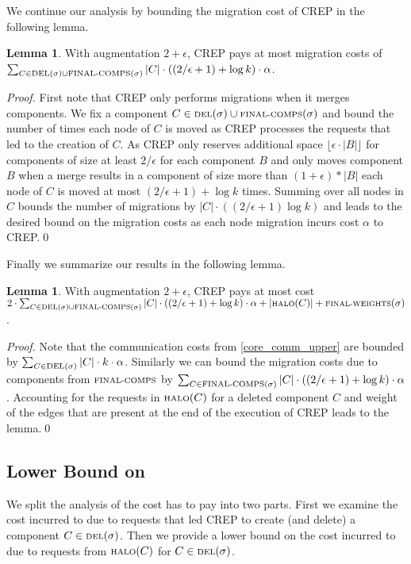 \documentclass[a4paper,xcolor=dvipsnames, tikz, 12pt]{article}
\newcommand{\nl}{\newline}
\newcommand{\crep}{C{\scriptsize REP}}
\newcommand{\del}{\text{\scriptsize DEL}}
\newcommand{\opt}{\text{O{\scriptsize PT}}}
\newcommand{\halo}{\text{\scriptsize HALO}}
\newcommand{\finalComps}{\text{\scriptsize FINAL-COMPS}}
\newcommand{\finalWeights}{\text{\scriptsize FINAL-WEIGHTS}}
\theoremstyle{definition}
\newtheorem{lemma}[defi]{Lemma}
\begin{document}
We continue our analysis by bounding the migration cost of \crep{} in the following lemma.
\begin{lemma}
	With augmentation $2+\epsilon$, \crep{} pays at most migration costs of\nl $\sum_{C\in\del{}(\sigma)\cup\finalComps(\sigma)}|C|\cdot((2/\epsilon+1)+\log k)\cdot\alpha$.
\end{lemma}

\textit{Proof.} First note that \crep{} only performs migrations when it merges components.
We fix a component $C\in\del{}(\sigma)\cup \finalComps(\sigma)$ and bound the number of times each node of $C$ is moved as \crep{} processes the requests that led to the creation of $C$. As \crep{} only reserves additional space $\lfloor\epsilon\cdot|B|\rfloor$ for components of size at least $2/\epsilon$ for each component $B$ and only moves component $B$ when a merge results in a component of size more than $(1+\epsilon)*|B|$ each node of $C$ is moved at most
$(2/\epsilon+1)+\log k$ times. Summing over all nodes in $C$ bounds the number of migrations by $|C|\cdot((2/\epsilon+1) \log k)$ and leads to the desired bound on the migration costs as each node migration incurs cost $\alpha$ to \crep{}.\qed\nl

Finally we summarize our results in the following lemma.

\begin{lemma}
	\label{crep_upper_bound}
	With augmentation $2+\epsilon$, \crep{} pays at most cost\nl $2\cdot\sum_{C\in\del{}(\sigma)\cup\finalComps(\sigma)}|C|\cdot((2/\epsilon+1)+\log k)\cdot\alpha+|\halo(C)|+\finalWeights(\sigma)$.
\end{lemma}
\textit{Proof.} Note that the communication costs from \cref{core_comm_upper} are bounded by $\sum_{C\in\del{}(\sigma)}|C|\cdot k\cdot\alpha$. Similarly we can bound the migration costs due to components from $\finalComps$ by $\sum_{C\in \finalComps(\sigma)}|C|\cdot((2/\epsilon+1)+\log k)\cdot\alpha$. Accounting for the requests in $\halo(C)$ for a deleted component $C$ and weight of the edges that are present at the end of the execution of \crep{} leads to the lemma.\qed


\subsection{Lower Bound on \opt{}}
We split the analysis of the cost \opt{} has to pay into two parts. First we examine the cost incurred to \opt{} due to requests that led \crep{} to create (and delete) a component $C\in\del{}(\sigma)$. Then we provide a lower bound on the cost incurred to \opt{} due to requests from $\halo(C)$ for $C\in\del{}(\sigma)$.
\end{document}
